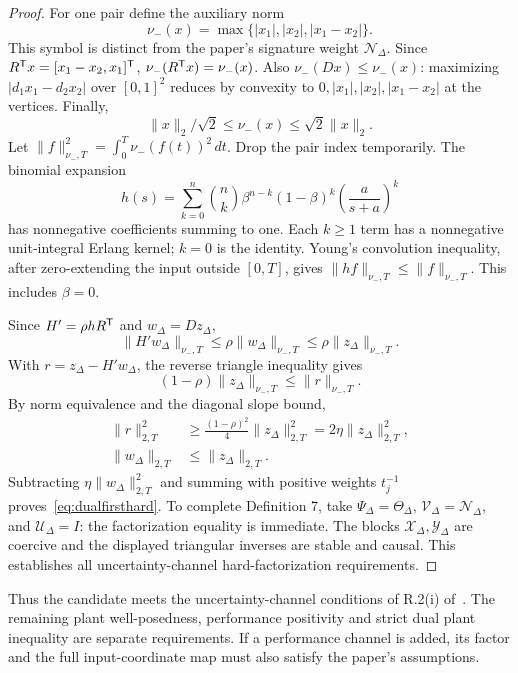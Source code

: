 \begin{proof}
For one pair define the auxiliary norm
\begin{equation*}
 \nu_-(x)=\max\{|x_1|,|x_2|,|x_1-x_2|\}.
\end{equation*}
This symbol is distinct from the paper's signature weight $\mathcal N_\Delta$. Since $R^{\mathsf{T}}x=[x_1-x_2,x_1]^{\mathsf{T}}$, $\nu_-(R^{\mathsf{T}}x)=\nu_-(x)$. Also $\nu_-(Dx)\le\nu_-(x)$: maximizing $|d_1x_1-d_2x_2|$ over $[0,1]^2$ reduces by convexity to $0,|x_1|,|x_2|,|x_1-x_2|$ at the vertices. Finally,
\begin{equation*}
 \|x\|_2/\sqrt2\le\nu_-(x)\le\sqrt2\|x\|_2.
\end{equation*}
Let $\|f\|_{\nu_-,T}^2=\int_0^T\nu_-(f(t))^2\,dt$. Drop the pair index temporarily. The binomial expansion
\begin{equation*}
 h(s)=\sum_{k=0}^{n}\binom nk\beta^{n-k}(1-\beta)^k
 \left(\frac{a}{s+a}\right)^k
\end{equation*}
has nonnegative coefficients summing to one. Each $k\ge1$ term has a nonnegative unit-integral Erlang kernel; $k=0$ is the identity. Young's convolution inequality, after zero-extending the input outside $[0,T]$, gives $\|hf\|_{\nu_-,T}\le\|f\|_{\nu_-,T}$. This includes $\beta=0$.

Since $H'=\rho h R^{\mathsf{T}}$ and $w_\Delta=D z_\Delta$,
\begin{equation*}
 \|H'w_\Delta\|_{\nu_-,T}\le\rho\|w_\Delta\|_{\nu_-,T}
 \le\rho\|z_\Delta\|_{\nu_-,T}.
\end{equation*}
With $r=z_\Delta-H'w_\Delta$, the reverse triangle inequality gives
\begin{equation*}
 (1-\rho)\|z_\Delta\|_{\nu_-,T}\le\|r\|_{\nu_-,T}.
\end{equation*}
By norm equivalence and the diagonal slope bound,
\begin{align*}
 \|r\|_{2,T}^2&\ge\frac{(1-\rho)^2}{4}\|z_\Delta\|_{2,T}^2
 =2\eta\|z_\Delta\|_{2,T}^2,\\
 \|w_\Delta\|_{2,T}&\le\|z_\Delta\|_{2,T}.
\end{align*}
Subtracting $\eta\|w_\Delta\|_{2,T}^2$ and summing with positive weights $t_j^{-1}$ proves~\eqref{eq:dualfirsthard}. To complete Definition 7, take $\Psi_\Delta=\Theta_\Delta$, $\mathcal V_\Delta=\mathcal N_\Delta$, and $\mathcal U_\Delta=I$: the factorization equality is immediate. The blocks $\mathcal X_\Delta,\mathcal Y_\Delta$ are coercive and the displayed triangular inverses are stable and causal. This establishes all uncertainty-channel hard-factorization requirements.
\end{proof}
Thus the candidate meets the uncertainty-channel conditions of R.2(i) of~\cite{dualPIE}. The remaining plant well-posedness, performance positivity and strict dual plant inequality are separate requirements. If a performance channel is added, its factor and the full input-coordinate map must also satisfy the paper's assumptions.

